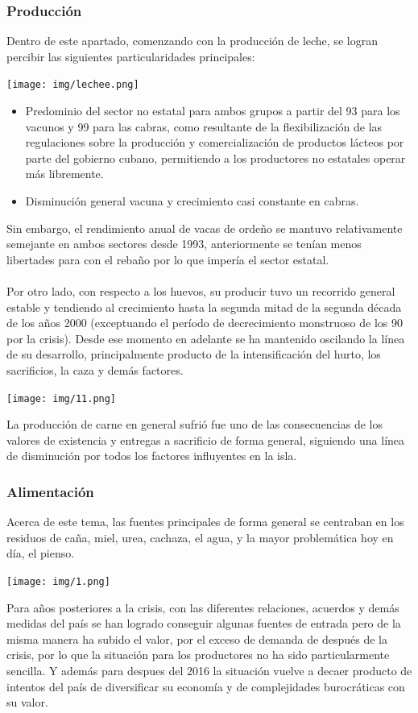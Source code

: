 \documentclass{article}
\begin{document}
\subsubsection{Producción}
Dentro de este apartado, comenzando con la producción de leche, se logran percibir las siguientes particularidades principales:
\begin{center}
    \texttt{[image: img/lechee.png]}
\end{center}
\begin{itemize}
    \item Predominio del sector no estatal para ambos grupos a partir del 93 para los vacunos y 99 para las cabras, como resultante de la flexibilización de las regulaciones sobre la producción y comercialización de productos lácteos por parte del gobierno cubano, 
    permitiendo a los productores no estatales operar más libremente.
    \item Disminución general vacuna y crecimiento casi constante en cabras. 
\end{itemize}
Sin embargo, el rendimiento anual de vacas de ordeño se mantuvo relativamente semejante en ambos sectores desde 1993, anteriormente se tenían menos libertades para con el rebaño por lo que impería el sector estatal.\\\\
Por otro lado, con respecto a los huevos, su producir tuvo un recorrido general estable y tendiendo al crecimiento hasta la segunda mitad de la segunda década de los años 2000 (exceptuando el período de decrecimiento monstruoso de los 90 por la crisis). Desde ese momento en adelante se ha mantenido oscilando la línea de su desarrollo, principalmente producto de la intensificación del hurto, los sacrificios, la caza y demás factores.
\begin{center}
    \texttt{[image: img/11.png]}
\end{center}
La producción de carne en general sufrió fue uno de las consecuencias de los valores de existencia y entregas a sacrificio de forma general, siguiendo una línea de disminución por todos los factores influyentes en la isla.
\newpage
\subsubsection{Alimentación}
Acerca de este tema, las fuentes principales de forma general se centraban en los residuos de caña, miel, urea, cachaza, el agua, y la mayor problemática hoy en día, el pienso.
\begin{center}
    \texttt{[image: img/1.png]}
\end{center}
Para años posteriores a la crisis, con las diferentes relaciones, acuerdos y demás medidas del país se han logrado conseguir algunas fuentes de entrada pero de la misma manera ha subido el valor, por el exceso de demanda de después de la crisis, por lo que la situación 
para los productores no ha sido particularmente sencilla. Y además para despues del 2016 la situación vuelve a decaer producto de intentos del país de diversificar su economía y de complejidades burocráticas con su valor.
\end{document}
